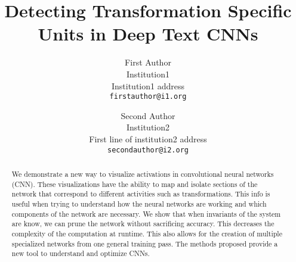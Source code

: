 \documentclass[10pt,twocolumn,letterpaper]{article}
\begin{document}
\title{Detecting Transformation Specific Units in Deep Text CNNs}

\author{First Author\\
Institution1\\
Institution1 address\\
{\tt\small firstauthor@i1.org}
\and
Second Author\\
Institution2\\
First line of institution2 address\\
{\tt\small secondauthor@i2.org}
}

\maketitle

\begin{abstract}
   We demonstrate a new way to visualize activations in convolutional neural networks (CNN). These visualizations have the ability to map and isolate sections of the network that correspond to different activities such as transformations. This info is useful when trying to understand how the neural networks are working and which components of the network are necessary. We show that when invariants of the system are know, we can prune the network without sacrificing accuracy. This decreases the complexity of the computation at runtime. This also allows for the creation of multiple specialized networks from one general training pass. The methods proposed provide a new tool to understand and optimize CNNs.
\end{abstract}

\end{document}
